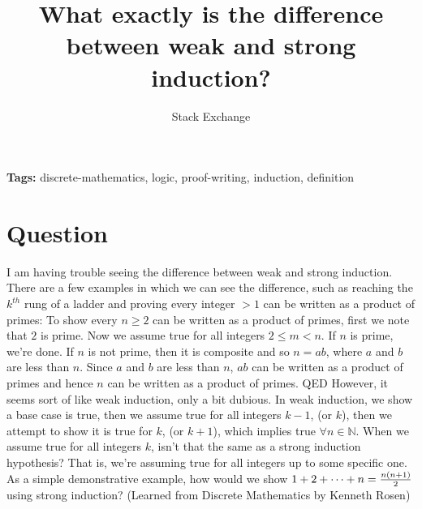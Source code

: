 \documentclass{article}
\title{What exactly is the difference between weak and strong induction?}
\author{Stack Exchange}
\date{}
\begin{document}
\maketitle

\noindent\textbf{Tags:} discrete-mathematics, logic, proof-writing, induction, definition

\section*{Question}
I am having trouble seeing the difference between weak and strong induction. There are a few examples in which we can see the difference, such as reaching the $k^{th}$ rung of a ladder and proving every integer $>1$ can be written as a product of primes: To show every $n\ge2$ can be written as a product of primes, first we note that $2$ is prime. Now we assume true for all integers $2 \le m<n$. If $n$ is prime, we're done. If $n$ is not prime, then it is composite and so $n=ab$, where $a$ and $b$ are less than $n$. Since $a$ and $b$ are less than $n$, $ab$ can be written as a product of primes and hence $n$ can be written as a product of primes. QED However, it seems sort of like weak induction, only a bit dubious. In weak induction, we show a base case is true, then we assume true for all integers $k-1$, (or $k$), then we attempt to show it is true for $k$, (or $k+1$), which implies true $\forall n \in \mathbb N$. When we assume true for all integers $k$, isn't that the same as a strong induction hypothesis? That is, we're assuming true for all integers up to some specific one. As a simple demonstrative example, how would we show $1+2+\cdots+n= {n(n+1) \over 2}$ using strong induction? (Learned from Discrete Mathematics by Kenneth Rosen)
\end{document}
